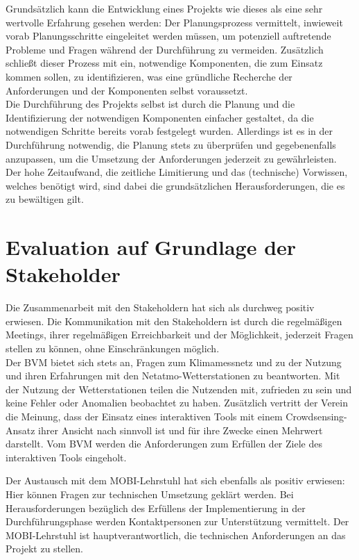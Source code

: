 Grundsätzlich kann die Entwicklung eines Projekts wie dieses als eine sehr wertvolle Erfahrung gesehen werden: Der Planungsprozess vermittelt, inwieweit vorab Planungsschritte eingeleitet werden müssen, um potenziell auftretende Probleme und Fragen während der Durchführung zu vermeiden. Zusätzlich schließt dieser Prozess mit ein, notwendige Komponenten, die zum Einsatz kommen sollen, zu identifizieren, was eine gründliche Recherche der Anforderungen und der Komponenten selbst voraussetzt. \\ Die Durchführung des Projekts selbst ist durch die Planung und die Identifizierung der notwendigen Komponenten einfacher gestaltet, da die notwendigen Schritte bereits vorab festgelegt wurden. Allerdings ist es in der Durchführung notwendig, die Planung stets zu überprüfen und gegebenenfalls anzupassen, um die Umsetzung der Anforderungen jederzeit zu gewährleisten. Der hohe Zeitaufwand, die zeitliche Limitierung und das (technische) Vorwissen, welches benötigt wird, sind dabei die grundsätzlichen Herausforderungen, die es zu bewältigen gilt.

\section{Evaluation auf Grundlage der Stakeholder}
\label{sec:evaluationstakeholder}
Die Zusammenarbeit mit den Stakeholdern hat sich als durchweg positiv erwiesen. Die Kommunikation mit den Stakeholdern ist durch die regelmäßigen Meetings, ihrer regelmäßigen Erreichbarkeit und der Möglichkeit, jederzeit Fragen stellen zu können, ohne Einschränkungen möglich. \\ Der \ac{BVM} bietet sich stets an, Fragen zum Klimamessnetz und zu der Nutzung und ihren Erfahrungen mit den Netatmo-Wetterstationen zu beantworten. Mit der Nutzung der Wetterstationen teilen die Nutzenden mit, zufrieden zu sein und keine Fehler oder Anomalien beobachtet zu haben. Zusätzlich vertritt der Verein die Meinung, dass der Einsatz eines interaktiven Tools mit einem Crowdsensing-Ansatz ihrer Ansicht nach sinnvoll ist und für ihre Zwecke einen Mehrwert darstellt. Vom \ac{BVM} werden die Anforderungen zum Erfüllen der Ziele des interaktiven Tools eingeholt.

Der Austausch mit dem \ac{MOBI}-Lehrstuhl hat sich ebenfalls als positiv erwiesen: Hier können Fragen zur technischen Umsetzung geklärt werden. Bei Herausforderungen bezüglich des Erfüllens der Implementierung in der Durchführungsphase werden Kontaktpersonen zur Unterstützung vermittelt. Der \ac{MOBI}-Lehrstuhl ist hauptverantwortlich, die technischen Anforderungen an das Projekt zu stellen.

